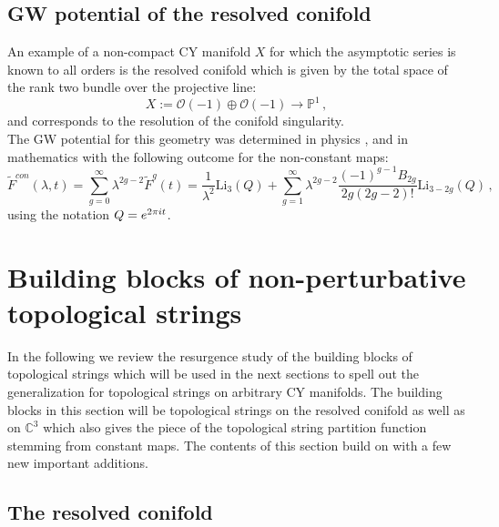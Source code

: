 \documentclass[a4paper,12pt,justification=centering]{article}
\numberwithin{equation}{section}
\newcommand{\ii}{\textnormal{i}}
\theoremstyle{plain}%
\theoremstyle{definition}
\begin{document}


\subsection{GW potential of the resolved conifold}
An example of a non-compact CY manifold $X$  for which the asymptotic series is known to all orders is the 
resolved conifold which is given by the total space of the rank two bundle over the projective line:
\begin{equation}
X := \mathcal{O}(-1) \oplus \mathcal{O}(-1) \rightarrow \mathbb{P}^1\,,
\end{equation}
and corresponds to the resolution of the conifold singularity.\\ 

The GW potential for this geometry was determined in physics \cite{Gopakumar:1998ii,GV}, and in mathematics \cite{Faber} with the following outcome for the non-constant maps:
\begin{equation}\label{resconfree}
\widetilde{F}^{con}(\lambda,t)= \sum_{g=0}^{\infty} \lambda^{2g-2} \widetilde{F}^g(t)= \frac{1}{\lambda^2} \mathrm{Li}_{3}(Q)+ \sum_{g=1}^{\infty} \lambda^{2g-2} \frac{(-1)^{g-1}B_{2g}}{2g (2g-2)!} \mathrm{Li}_{3-2g} (Q) \, ,
\end{equation}
using the notation $Q=e^{2\pi\ii t}$. 



\section{Building blocks of non-perturbative topological strings} \label{sec:buildingblocks}

In the following we review the resurgence study of the building blocks of topological strings which will be used in the next sections to spell out the generalization for topological strings on arbitrary CY manifolds. The building blocks in this section will be topological strings on  the resolved conifold as well as on $\mathbb{C}^3$ which also gives the piece of the topological string partition function stemming from constant maps.  The contents of this section build on \cite{Alim:2021mhp} with a few new important additions. 


\subsection{The resolved conifold}\label{subsec:rescon}
\end{document}
